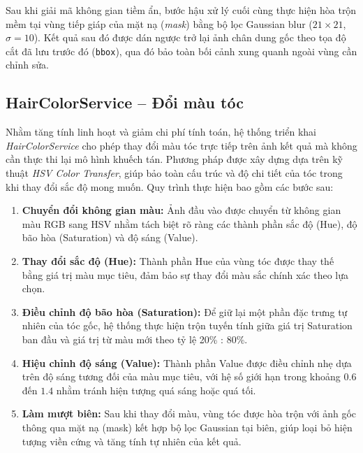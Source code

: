 \documentclass[../main.tex]{subfiles}
\begin{document}
Sau khi giải mã không gian tiềm ẩn, bước hậu xử lý cuối cùng thực hiện hòa trộn mềm tại vùng tiếp giáp của mặt nạ (\textit{mask}) bằng bộ lọc Gaussian blur ($21 \times 21$, $\sigma = 10$). Kết quả sau đó được dán ngược trở lại ảnh chân dung gốc theo tọa độ cắt đã lưu trước đó (\texttt{bbox}), qua đó bảo toàn bối cảnh xung quanh ngoài vùng cần chỉnh sửa.

\subsection{HairColorService -- Đổi màu tóc}

Nhằm tăng tính linh hoạt và giảm chi phí tính toán, hệ thống triển khai \textit{HairColorService} cho phép thay đổi màu tóc trực tiếp trên ảnh kết quả mà không cần thực thi lại mô hình khuếch tán. Phương pháp được xây dựng dựa trên kỹ thuật \textit{HSV Color Transfer}, giúp bảo toàn cấu trúc và độ chi tiết của tóc trong khi thay đổi sắc độ mong muốn. Quy trình thực hiện bao gồm các bước sau:

\begin{enumerate}
    \item \textbf{Chuyển đổi không gian màu:} Ảnh đầu vào được chuyển từ không gian màu RGB sang HSV nhằm tách biệt rõ ràng các thành phần sắc độ (Hue), độ bão hòa (Saturation) và độ sáng (Value).
    
    \item \textbf{Thay đổi sắc độ (Hue):} Thành phần Hue của vùng tóc được thay thế bằng giá trị màu mục tiêu, đảm bảo sự thay đổi màu sắc chính xác theo lựa chọn.
    
    \item \textbf{Điều chỉnh độ bão hòa (Saturation):} Để giữ lại một phần đặc trưng tự nhiên của tóc gốc, hệ thống thực hiện trộn tuyến tính giữa giá trị Saturation ban đầu và giá trị từ màu mới theo tỷ lệ 20\% : 80\%.
    
    \item \textbf{Hiệu chỉnh độ sáng (Value):} Thành phần Value được điều chỉnh nhẹ dựa trên độ sáng tương đối của màu mục tiêu, với hệ số giới hạn trong khoảng $0.6$ đến $1.4$ nhằm tránh hiện tượng quá sáng hoặc quá tối.
    
    \item \textbf{Làm mượt biên:} Sau khi thay đổi màu, vùng tóc được hòa trộn với ảnh gốc thông qua mặt nạ (mask) kết hợp bộ lọc Gaussian tại biên, giúp loại bỏ hiện tượng viền cứng và tăng tính tự nhiên của kết quả.
\end{enumerate}
\end{document}
